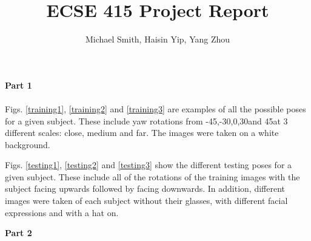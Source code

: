 \documentclass[10pt,letterpaper]{article}
\author{Michael Smith, Haisin Yip, Yang Zhou}
\title{ECSE 415 Project Report}
\begin{document}
\maketitle

\textbf{Part 1}
\paragraph{}
Figs. \ref{training1}, \ref{training2} and \ref{training3} are examples of all the possible poses for a given subject.  These include yaw rotations from -45\degree,-30\degree,0\degree,30\degree and 45\degree at 3 different scales: close, medium and far.  The images were taken on a white background.

Figs. \ref{testing1}, \ref{testing2} and \ref{testing3} show the different testing poses for a given subject.  These include all of the rotations of the training images with the subject facing upwards followed by facing downwards.  In addition, different images were taken of each subject without their glasses, with different facial expressions and with a hat on.

\vspace{5mm}
\textbf{Part 2}
\paragraph{}
\end{document}

